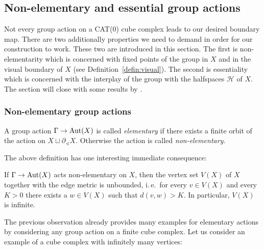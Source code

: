 \subsection{Non-elementary and essential group actions}
\label{sec:special}

Not every group action on a CAT(0) cube complex leads to our desired boundary map. There are two additionally properties we need to demand in order for our construction to work. These two are introduced in this section. The first is non-elementarity which is concerned with fixed points of the group in \(X\) and in the visual boundary of \(X\) (see Definition~\ref{defin:visual}). The second is essentiality which is concerned with the interplay of the group with the halfspaces \(\mathcal{H}\) of \(X\). The section will close with some results by \textcite{Caprace2010}.

\subsubsection*{Non-elementary group actions}
\label{non-elementary}

\begin{defin}
  A group action \(\Gamma \to \operatorname{Aut}(X)\) is called \emph{elementary} if there exists a finite orbit of the action on \(X \sqcup \partial_{\sphericalangle}X\). Otherwise the action is called \emph{non-elementary}.
\end{defin}

The above definition has one interesting immediate consequence:
\begin{prop}
  \label{prop:ne-unbounded}
  If \(\Gamma \to \operatorname{Aut}(X)\) acts non-elementary on \(X\), then the vertex set \(V(X)\) of \(X\) together with the edge metric is unbounded, i.\,e.\ for every \(v \in V(X)\) and every \(K>0\) there exists a \(w \in V(X)\) such that \(d(v,w)>K\). In particular, \(V(X)\) is infinite.
\end{prop}

The previous observation already provides many examples for elementary actions by considering any group action on a finite cube complex. Let us consider an example of a cube complex with infinitely many vertices:

